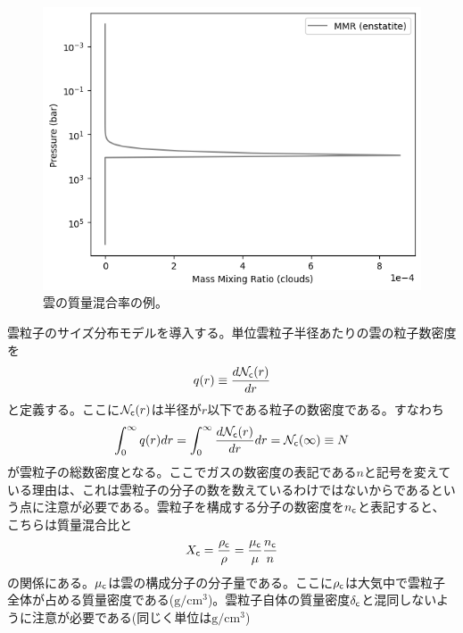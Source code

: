 \begin{figure}[htb]
\begin{center}
\includegraphics[width=\linewidth]{fig/clouds/mmrcloud.png}
\caption{雲の質量混合率の例。\label{fig:vmrcloud}}
\end{center}
\end{figure}

雲粒子のサイズ分布モデルを導入する。単位雲粒子半径あたりの雲の粒子数密度を
\begin{align}
    q(r) \equiv  \frac{d \mathcal{N}_{\mathsf{c}} (r)}{d r} 
\end{align}
と定義する。ここに$\mathcal{N}_{\mathsf{c}}(r)$は半径が$r$以下である粒子の数密度である。すなわち
\begin{align}
    \int_0^\infty q(r) dr = \int_0^\infty \frac{d \mathcal{N}_{\mathsf{c}} (r)}{d r} dr = \mathcal{N}_{\mathsf{c}} (\infty) \equiv N
\end{align}
が雲粒子の総数密度となる。ここでガスの数密度の表記である$n$と記号を変えている理由は、これは雲粒子の分子の数を数えているわけではないからであるという点に注意が必要である。雲粒子を構成する分子の数密度を$n_{\mathsf{c}}$と表記すると、こちらは質量混合比と
\begin{align}
    X_{\mathsf{c}} = \frac{\rho_{\mathsf{c}}}{\rho} = \frac{\mu_{\mathsf{c}}}{\mu} \frac{n_{\mathsf{c}}}{n} 
\end{align}
の関係にある。${\mu_{\mathsf{c}}}$は雲の構成分子の分子量である。ここに$\rho_{\mathsf{c}}$は大気中で雲粒子全体が占める質量密度である($\mathrm{g/cm^3}$)。雲粒子自体の質量密度$\delta_{\mathsf{c}}$と混同しないように注意が必要である(同じく単位は$\mathrm{g/cm^3}$)

